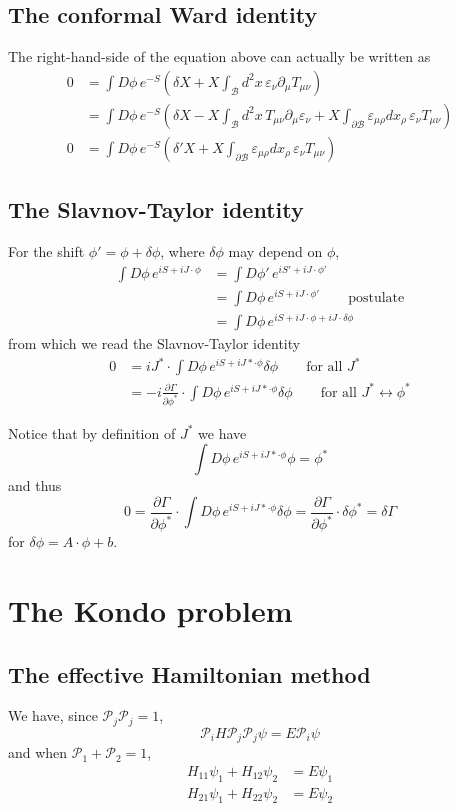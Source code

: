 \documentclass[12pt, oneside]{book}
\begin{document}
\section*{The conformal Ward identity}
The right-hand-side of the equation above can actually be written as
\begin{align*}
0
&=\int D\phi\,e^{-S}\left(\delta X+X\int_{\mathcal{B}}d^2x\,\varepsilon_{\nu}\partial_{\mu}T_{\mu\nu}\right)\\
&=\int D\phi\,e^{-S}\left(\delta X-X\int_{\mathcal{B}}d^2x\,T_{\mu\nu}\partial_{\mu}\varepsilon_{\nu}+X\int_{\partial\mathcal{B}}\varepsilon_{\mu\rho}dx_{\rho}\,\varepsilon_{\nu}T_{\mu\nu}\right)\\[10pt]
0
&=\int D\phi\,e^{-S}\left(\delta'X+X\int_{\partial\mathcal{B}}\varepsilon_{\mu\rho}dx_{\rho}\,\varepsilon_{\nu}T_{\mu\nu}\right)
\end{align*}

\section*{The Slavnov-Taylor identity}
For the shift $\phi'=\phi+\delta\phi$, where $\delta\phi$ may depend on $\phi$,
\begin{align*}
\int D\phi\,e^{iS+iJ\cdot\phi}
&=\int D\phi'\,e^{iS'+iJ\cdot\phi'}\\
&=\int D\phi\,e^{iS+iJ\cdot\phi'}\qquad
\text{postulate}\\
&=\int D\phi\,e^{iS+iJ\cdot\phi+iJ\cdot\delta\phi}
\end{align*}
from which we read the Slavnov-Taylor identity
\begin{align*}
0
&=iJ^*\cdot\int D\phi\,e^{iS+iJ*\cdot\phi}\delta\phi\qquad
\text{for all $J^*$}\\
&=-i\frac{\partial\Gamma}{\partial\phi^*}\cdot\int D\phi\,e^{iS+iJ*\cdot\phi}\delta\phi\qquad
\text{for all $J^*\leftrightarrow\phi^*$}
\end{align*}

Notice that by definition of $J^*$ we have
\[
\int D\phi\,e^{iS+iJ*\cdot\phi}\phi=\phi^*
\]
and thus
\[
0=\frac{\partial\Gamma}{\partial\phi^*}\cdot\int D\phi\,e^{iS+iJ*\cdot\phi}\delta\phi=\frac{\partial\Gamma}{\partial\phi^*}\cdot\delta\phi^*=\delta\Gamma
\]
for $\delta\phi=A\cdot\phi+b$.

\chapter{The Kondo problem}
\section*{The effective Hamiltonian method}
We have, since $\mathcal{P}_j\mathcal{P}_j=1$,
\[
\mathcal{P}_iH\mathcal{P}_j\mathcal{P}_j\psi=E\mathcal{P}_i\psi
\]
and when $\mathcal{P}_1+\mathcal{P}_2=1$,
\begin{align*}
H_{11}\psi_1+H_{12}\psi_2&=E\psi_1\\
H_{21}\psi_1+H_{22}\psi_2&=E\psi_2
\end{align*}
\end{document}
